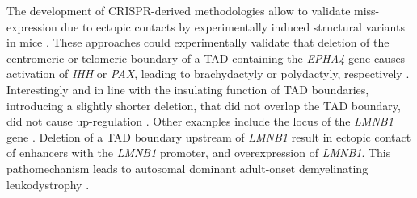 \documentclass[a4paper,twoside=true,openright,parskip=full,chapterprefix=true,11pt,headings=normal,bibliography=totoc,listof=totoc,titlepage=on,captions=tableabove,draft=false]{scrreprt}
\theoremstyle{definition}
\theoremstyle{definition}
\theoremstyle{definition}
\theoremstyle{remark}
\begin{document}
The development of CRISPR-derived methodologies allow to validate
miss-expression due to ectopic contacts by experimentally induced
structural variants in mice \citep{Kraft2015, Andrey2017}. These
approaches could experimentally validate that deletion of the
centromeric or telomeric boundary of a TAD containing the \emph{EPHA4}
gene causes activation of \emph{IHH} or \emph{PAX}, leading to
brachydactyly or polydactyly, respectively \citep{Lupianez2015}.
Interestingly and in line with the insulating function of TAD
boundaries, introducing a slightly shorter deletion, that did not
overlap the TAD boundary, did not cause up-regulation
\citep{Lupianez2015}. Other examples include the locus of the
\emph{LMNB1} gene \citep{Giorgio2015}. Deletion of a TAD boundary
upstream of \emph{LMNB1} result in ectopic contact of enhancers with the
\emph{LMNB1} promoter, and overexpression of \emph{LMNB1}. This
pathomechanism leads to autosomal dominant adult-onset demyelinating
leukodystrophy \citep{Giorgio2015}.
\end{document}
